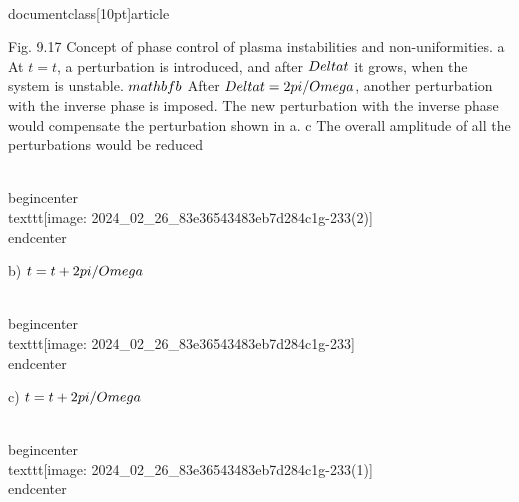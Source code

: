 \\documentclass[10pt]{article}
\begin{document}
{{{{{{Fig. 9.17 Concept of phase control of plasma instabilities and non-uniformities. a At $t=t$, a perturbation is introduced, and after $\\Delta t$ it grows, when the system is unstable. $\\mathbf{b}$ After $\\Delta t=2 \\pi / \\Omega$, another perturbation with the inverse phase is imposed. The new perturbation with the inverse phase would compensate the perturbation shown in a. c The overall amplitude of all the perturbations would be reduced

\\begin{center}
\\texttt{[image: 2024\_02\_26\_83e36543483eb7d284c1g-233(2)]}
\\end{center}

b) $t=t+2 \\pi / \\Omega$

\\begin{center}
\\texttt{[image: 2024\_02\_26\_83e36543483eb7d284c1g-233]}
\\end{center}

c) $t=t+2 \\pi / \\Omega$

\\begin{center}
\\texttt{[image: 2024\_02\_26\_83e36543483eb7d284c1g-233(1)]}
\\end{center}

}}}}}}
\end{document}
